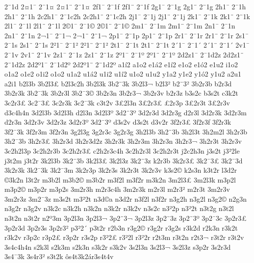 {2^^a81d
2^^a41^^af
2^^af1^^a4
2^^a41^^a8
2^^a81^^a4
2f1^^af
2^^af1f
2f1^^a8
2^^a81f
2g1^^af
2^^af1g
2g1^^a8
2^^a81g
2h1^^af
2^^af1h
2h1^^a8
2^^a81h
2c2h1^^af
2^^af1c2h
2c2h1^^a8
2^^a81c2h
2j1^^af
2^^af1j
2j1^^a8
2^^a81j
2k1^^af
2^^af1k
2k1^^a8
2^^a81k
2l1^^af
2^^af1l
2l1^^a8
2^^a81l
2^^a91^^af
2^^af1^^a9
2^^a91^^a8
2^^a81^^a9
2m1^^af
2^^af1m
2m1^^a8
2^^a81m
2n1^^af
2^^af1n
2n1^^a8
2^^a81n
2^^ac1^^af
2^^af1^^ac
2^^ac1^^a8
2^^a81^^ac
2p1^^af
2^^af1p
2p1^^a8
2^^a81p
2r1^^af
2^^af1r
2r1^^a8
2^^a81r
2s1^^af
2^^af1s
2s1^^a8
2^^a81s
2^^b21^^af
2^^af1^^b2
2^^b21^^a8
2^^a81^^b2
2t1^^af
2^^af1t
2t1^^a8
2^^a81t
2^^b41^^af
2^^af1^^b4
2^^b41^^a8
2^^a81^^b4
2v1^^af
2^^af1v
2v1^^a8
2^^a81v
2z1^^af
2^^af1z
2z1^^a8
2^^a81z
2^^ba1^^af
2^^af1^^ba
2^^ba1^^a8
2^^a81^^ba
2d2z1^^af
2^^af1d2z
2d2z1^^a8
2^^a81d2z
2d2^^ba1^^af
2^^af1d2^^ba
2d2^^ba1^^a8
2^^a81d2^^ba
a1^^ed2
a1o2
e1^^e12
e1^^ed2
e1o2
e1^^f32
e1u2
i1o2
o1a2
o1e2
o1i2
o1o2
u1a2
u1^^e12
u1i2
u1^^ed2
u1o2
u1u2
y1a2
y1e2
y1^^f32
y1u2
a2u1
a2i1
b2l3b
3b2l3^^a3
b2l3c2h
3b2l3k
3b2^^a83k
3b2l3^^ac
b2l3^^b2
b2^^a83^^b2
3b2r3b
b2r3d
3b2r3k
3b2^^af3k
3b2r3l
3b2^^af3^^a9
3b2r3n
3b2r3^^ac
3b2r3v
b2r3z
b3s2c
b3s2t
c3k2t
3c2r3^^a3
3c2^^af3^^a3
3c2r3k
3c2^^af3k
c3t2v
3^^a32l3n
3^^a32r3^^a3
^^a32r3p
3^^a32r3t
3^^a32r3v
d3c4h4n
3d2l3b
3d2l3h
d2l3n
3d2l3^^ba
3d2^^a83^^ba
3d2r3d
3d2r3g
d2r3l
3d2r3k
3d2r3m
d2r3n
3d2r3v
3d2r3z
3d2r3^^ba
3d2^^af3^^ba
d3s2v
d3s2t
d3v2r
3f2r3^^a3
3f2r3f
3f2r3k
3f2^^af3k
3f2r3m
3f2r3n
3g2l3g
3g2r3c
3g2r3g
3h2l3b
3h2^^a83b
3h2l3t
3h2m2l
3h2r3b
3h2^^af3b
3h2r3^^a3
3h2r3d
3h2r3d2z
3h2r3k
3h2r3m
3h2r3n
3h2r3^^ac
3h2r3t
3h2r3v
3c2h2l3p
3c2h2r3b
3c2h2r3^^a3
c2h2r3c4h
3c2h2r3l
3c2h2r3t
j2c2h3n
j3s2t
j3^^b22le
j3t2m
j3t2r
3k2l3b
3k2^^a83b
3k2l3^^a3
3k2l3z
3k2^^a83z
k2r3b
3k2r3^^a3
3k2^^af3^^a3
3k2^^af3d
3k2r3k
3k2^^af3k
3k2^^af3m
3k2r3p
3k2r3s
3k2r3t
3k2r3v
k3s2^^a9
k2s3n
k3t2r
l3d2r
^^a93k2n
l3t2r
m3b2l
m3b2^^a9
m3b2r
m3f2l
m3f2r
m3k2n
3m2l3^^a3
3m2l3k
m3p2l
m3p2^^a9
m3p2r
m3p2s
3m2r3h
m2r3c4h
3m2r3k
m2r3l
m2r3^^b2
m2r3t
3m2r3v
3m2r3z
3m2^^af3z
m3s2t
m3^^b22t
n3d^^a9a
n3d2r
n3f2l
n3f2r
n3g2h
n3g2l
n3g2^^a9
n2g3n
n3g2r
n3g2v
n3k2c
n3k2h
n3k2n
n3k2r
n3k2v
n3s2c
n3^^b22p
n3^^b22t
n3t2g
n3t2l
n3t2n
n3t2r
n2^^ba3m
3p2l3n
3p2l3^^ac
3p2^^a83^^ac
3p2l3z
3p2^^a83z
3p2^^a83^^ba
3p2^^af3c
3p2r3^^a3
3p2r3d
3p2r3s
3p2r3^^b2
p3^^b22^^b4
p3t2r
r2b3n
r3g2^^a9
r3g2r
r3g2s
r3k2d
r2k3n
r3k2t
r3k2v
r3p2c
r3p2^^a3
r3p2r
r3s2p
r3^^b22^^a3
r3^^b22l
r3^^b22r
r2t3m
r3t2n
r2t3^^ac
r3t2r
r3t2v
3s4c4h4n
s2k3l
s2k3m
s2k3n
s3k2r
s3k2v
3s2l3n
3s2l3^^ac
3s2l3z
s3p2r
3s2r3d
3s4^^af3k
3s4r3^^b2
s3t2k
^^f4s4t3k2^^e1r3s4t4v
}
